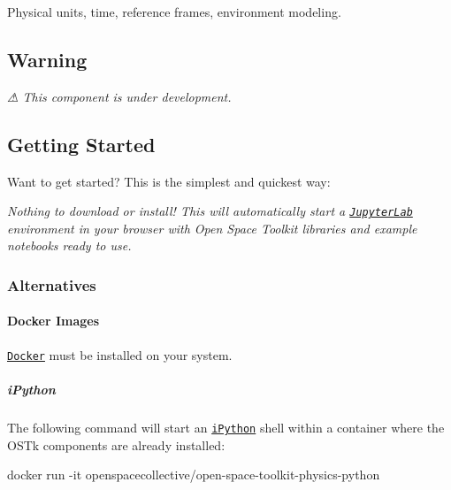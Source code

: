 \href{https://travis-ci.com/open-space-collective/open-space-toolkit-physics}{\tt } \href{https://codecov.io/gh/open-space-collective/open-space-toolkit-physics}{\tt } \href{https://open-space-collective.github.io/open-space-toolkit-physics}{\tt } \href{https://badge.fury.io/gh/open-space-collective%2Fopen-space-toolkit-physics}{\tt } \href{https://badge.fury.io/py/open-space-toolkit-physics}{\tt } \href{https://opensource.org/licenses/Apache-2.0}{\tt }

Physical units, time, reference frames, environment modeling.

\subsection*{Warning}

{\itshape ⚠ This component is under development.}

\subsection*{Getting Started}

Want to get started? This is the simplest and quickest way\+:

\href{https://mybinder.org/v2/gh/open-space-collective/open-space-toolkit-physics/master?urlpath=lab/tree/tutorials%2Fpython%2Fnotebooks}{\tt }

{\itshape Nothing to download or install! This will automatically start a \href{https://jupyterlab.readthedocs.io/en/stable/}{\tt Jupyter\+Lab} environment in your browser with Open Space Toolkit libraries and example notebooks ready to use.}

\subsubsection*{Alternatives}

\paragraph*{Docker Images}

\href{https://www.docker.com/}{\tt Docker} must be installed on your system.

\subparagraph*{i\+Python}

The following command will start an \href{https://ipython.org/}{\tt i\+Python} shell within a container where the O\+S\+Tk components are already installed\+:


\begin{DoxyCode}
docker run -it openspacecollective/open-space-toolkit-physics-python
\end{DoxyCode}


